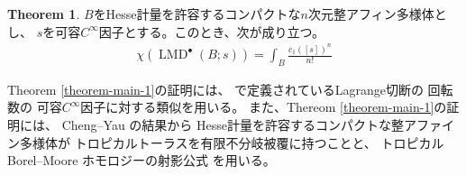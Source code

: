 \documentclass[uplatex,dvipdfmx,12pt]{jsarticle}
\numberwithin{equation}{section}
\theoremstyle{definition}
\newtheorem{theorem}{Theorem}[section]
\newcommand{\opn}[1]{\operatorname{#1}}
\newcommand{\aftersection}{\vspace{-8pt}}
\begin{document}
\begin{theorem}
\label{theorem-main-2}
$B$をHesse計量を許容するコンパクトな$n$次元整アフィン多様体とし、
$s$を可容$C^{\infty}$因子とする。このとき、次が成り立つ。
\begin{align}
\chi(\opn{LMD}^{\bullet}(B;s))=\int_B \frac{c_1([s])^n}{n!}
\end{align}
\end{theorem}

Theorem \ref{theorem-main-1}の証明には、
\cite{auroux2022lagrangian}で定義されているLagrange切断の
回転数の
可容$C^{\infty}$因子に対する類似を用いる。
また、Thereom \ref{theorem-main-1}の証明には、
Cheng--Yau \cite{MR714338}の結果から
Hesse計量を許容するコンパクトな整アファイン多様体が
トロピカルトーラスを有限不分岐被覆に持つことと、
トロピカル Borel--Moore
ホモロジーの射影公式
\cite{gross2019sheaftheoretic}を用いる。

\aftersection

{\small


}
\end{document}
